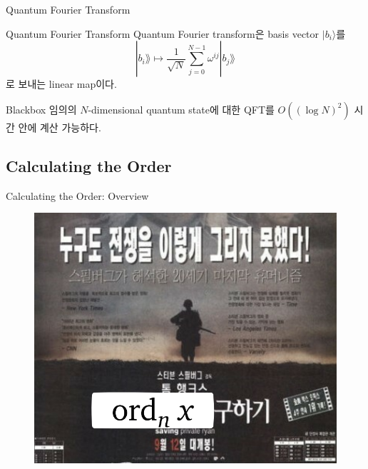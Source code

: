 \documentclass[../240513_msquare_shor.tex]{subfiles}
\begin{document}
\begin{frame}{Quantum Fourier Transform}
    \begin{center}
    \end{center}
    \begin{block}{Quantum Fourier Transform}
        Quantum Fourier transform은 basis vector \(\vert b_i \rangle\)를
        \[
            | b_i \rang \longmapsto
            \frac{1}{\sqrt{N}} \sum_{j = 0}^{N-1} \omega^{ij} | b_j \rang
        \]
        로 보내는 linear map이다.
    \end{block}
    \pause
    \begin{exampleblock}{Blackbox}
        임의의 \(N\)-dimensional quantum state에 대한
        QFT를 \(O((\log N)^2)\) 시간 안에 계산 가능하다.
    \end{exampleblock}
\end{frame}

\subsection{Calculating the Order}
\begin{frame}{Calculating the Order: Overview}
    \begin{figure}
        \center
        \includegraphics[width=.7\linewidth]{images/saving_order.png}
    \end{figure}
\end{frame}
\end{document}
